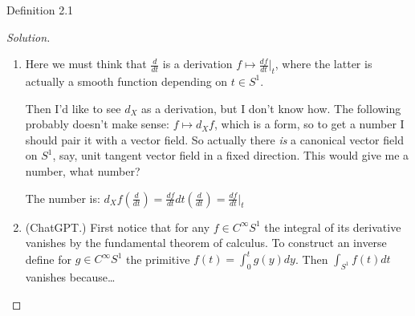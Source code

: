 \begin{thing3}{Definition 2.1}
\begin{proof}[Solution]
\begin{enumerate}
\[\begin{tikzcd}[column sep=small]
	\leavevmode\arrow[r]&H^{1}_X(M)\arrow[r]&H^{1}(X)\otimes \mathbb{R} \oplus  H^{0}(X)\otimes \mathbb{R}\arrow[r]&H^{1}(S^1)\arrow[r]&\cdots
\end{tikzcd}\]
\[\begin{tikzcd}[column sep=small]
	\leavevmode\arrow[r]&H^{2}_X(M)\arrow[r]&H^{1}(X)\otimes \mathbb{R} \oplus  H^{2}(X)\otimes \mathbb{R}\arrow[r]&0\arrow[r]&\cdots
\end{tikzcd}\]
\[\begin{tikzcd}[column sep=small]
	\leavevmode\arrow[r]&H^{3}_X(M)\arrow[r]&H^{3}(X)\otimes \mathbb{R} \oplus  H^{2}(X)\otimes \mathbb{R}\arrow[r]&0\arrow[r]&\cdots
\end{tikzcd}\]


So I wonder how to finish. Perhaps using some spectral sequence?

\iffalse if the sequence
\[\begin{tikzcd}0\arrow[r]&H^{0}_X(M)\arrow[r]&H^{0}(X)\arrow[r]&\mathbb{R}\end{tikzcd}\]
gives
\[H^{0}_X(M)\cong H^{0}(X)\otimes C^\infty S^1\]
{\color{2}Looks like not.}

\textbf{Note.} Looks like using Serre spectral sequence (adding the hypothesis that \(X\) is simply connected yields \(H^0_X(M)\cong H^0(X) \otimes H^0(S^1)\). So the question of how the smooth functions \(C^\infty S^1\) appear remains a mystery.
\fi
\item Here we must think that \(\frac{d}{dt}\) is a derivation \(f \mapsto \frac{df}{dt}\Big|_{t}\), where the latter is actually a smooth function depending on \(t \in S^1\). 


	Then I'd like to see \(d_X\) as a derivation, but I don't know how. The following probably doesn't make sense: \(f \mapsto d_Xf\), which is a form, so to get a number I should pair it with a vector field. So actually there \textit{is} a canonical vector field on \(S^1\), say, unit tangent vector field in a fixed direction. This would give me a number, what number?

	The number is: \(d_Xf\left(\frac{d}{dt}\right) =\frac{d f}{d t}dt\left(\frac{d}{dt}\right) =\frac{df}{dt}\Big|_{t}\)

\item (ChatGPT.) First notice that for any \(f \in C^\infty S^1\) the integral of its derivative vanishes by the fundamental theorem of calculus. To construct an inverse define for \(g \in C^\infty S^1\) the primitive \(f(t)=\int_{0}^tg(y)dy\). Then \(\int_{S^1}f(t)dt\) {\color{4}vanishes because…}
\end{enumerate}
\end{proof}


\end{thing3}
